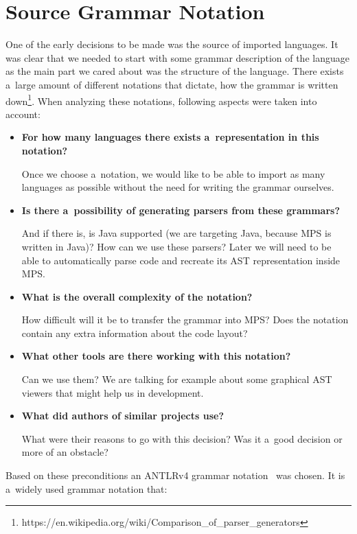 \chapter{Source Grammar Notation}
\label{chap:source_grammar_notation}

One of the early decisions to be made was the source of imported languages.
It was clear that we needed to start with some grammar description of the language as the main part we cared about was the structure of the language.
There exists a~large amount of different notations that dictate, how the grammar is written down\footnote{https://en.wikipedia.org/wiki/Comparison{\_}of{\_}parser{\_}generators}.
When analyzing these notations, following aspects were taken into account:

\begin{itemize}
	\item \textbf{For how many languages there exists a~representation in this notation?}

	Once we choose a~notation, we would like to be able to import as many languages as possible without the need for writing the grammar ourselves.

	\item \textbf{Is there a~possibility of generating parsers from these grammars?}

	And if there is, is Java supported (we are targeting Java, because MPS is written in Java)? How can we use these parsers? Later we will need to be able to automatically parse code and recreate its AST representation inside MPS.

	\item \textbf{What is the overall complexity of the notation?}

	How difficult will it be to transfer the grammar into MPS? Does the notation contain any extra information about the code layout?

	\item \textbf{What other tools are there working with this notation?}

	Can we use them? We are talking for example about some graphical AST viewers that might help us in development.

	\item \textbf{What did authors of similar projects use?}

	What were their reasons to go with this decision? Was it a~good decision or more of an obstacle?
\end{itemize}

Based on these preconditions an ANTLRv4 grammar notation~\cite{ANTLR4reference} was chosen.
It is a~widely used grammar notation that:


